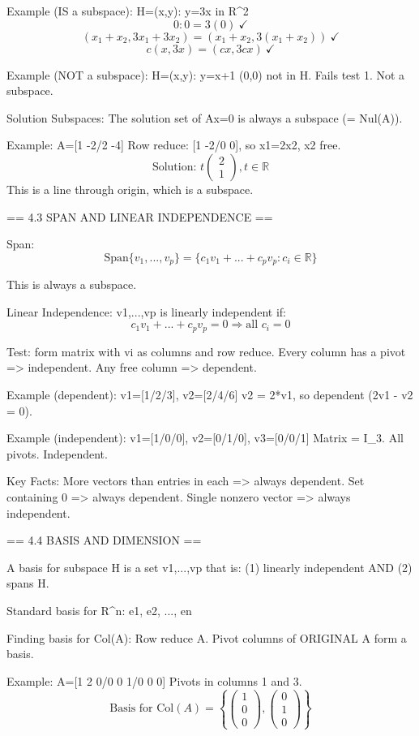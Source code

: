 Example (IS a subspace): H={(x,y): y=3x} in R^2
$$0: 0=3(0)\ \checkmark$$
$$(x_1+x_2, 3x_1+3x_2) = (x_1+x_2, 3(x_1+x_2))\ \checkmark$$
$$c(x,3x)=(cx,3cx)\ \checkmark$$

Example (NOT a subspace): H={(x,y): y=x+1}
(0,0) not in H. Fails test 1. Not a subspace.

Solution Subspaces:
The solution set of Ax=0 is always a subspace (= Nul(A)).

Example: A=[1 -2/2 -4]
Row reduce: [1 -2/0 0], so x1=2x2, x2 free.
$$\text{Solution: } t\begin{pmatrix}2\\1\end{pmatrix}, t \in \mathbb{R}$$
This is a line through origin, which is a subspace.


== 4.3 SPAN AND LINEAR INDEPENDENCE ==

Span:
$$\text{Span}\{v_1,...,v_p\} = \{c_1v_1+...+c_pv_p : c_i \in \mathbb{R}\}$$

This is always a subspace.

Linear Independence:
{v1,...,vp} is linearly independent if:
$$c_1v_1+...+c_pv_p = 0 \Rightarrow \text{all } c_i = 0$$

Test: form matrix with vi as columns and row reduce.
Every column has a pivot => independent.
Any free column => dependent.

Example (dependent): v1=[1/2/3], v2=[2/4/6]
v2 = 2*v1, so dependent (2v1 - v2 = 0).

Example (independent): v1=[1/0/0], v2=[0/1/0], v3=[0/0/1]
Matrix = I_3. All pivots. Independent.

Key Facts:
More vectors than entries in each => always dependent.
Set containing 0 => always dependent.
Single nonzero vector => always independent.


== 4.4 BASIS AND DIMENSION ==

A basis for subspace H is a set {v1,...,vp} that is:
(1) linearly independent  AND  (2) spans H.

Standard basis for R^n: {e1, e2, ..., en}

Finding basis for Col(A):
Row reduce A. Pivot columns of ORIGINAL A form a basis.

Example: A=[1 2 0/0 0 1/0 0 0]
Pivots in columns 1 and 3.
$$\text{Basis for Col}(A) = \left\{\begin{pmatrix}1\\0\\0\end{pmatrix}, \begin{pmatrix}0\\1\\0\end{pmatrix}\right\}$$

